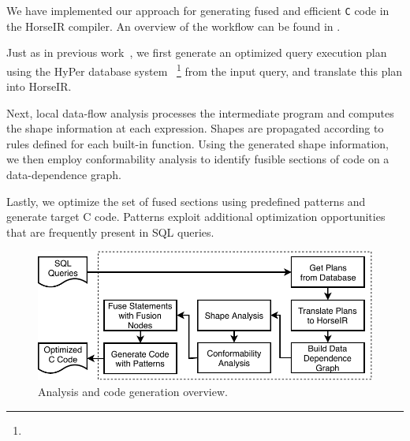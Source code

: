 We have implemented our approach for generating fused and efficient
\texttt{C} code in the HorseIR compiler. An overview of the workflow
can be found in .

Just as in previous work~\OldPaper, we first generate an optimized
query execution plan using the HyPer database system~\cite{Neumann2011:HyPer}
\footnote{}
from the input query, and translate this plan into HorseIR.

Next, local data-flow analysis processes the intermediate program and
computes the shape information at each expression. Shapes are propagated
according to rules defined for each built-in function. Using the
generated shape information, we then employ conformability analysis to
identify fusible sections of code on a data-dependence graph.

Lastly, we optimize the set of fused sections using predefined patterns
and generate target C code. Patterns exploit additional optimization
opportunities that are frequently present in SQL queries.

\begin{figure}[htbp]
\centering
\includegraphics[width=.95\columnwidth]{./src/figure/overview-v4.pdf}
\caption{Analysis and code generation overview.} \label{fig:overview}
\end{figure}
